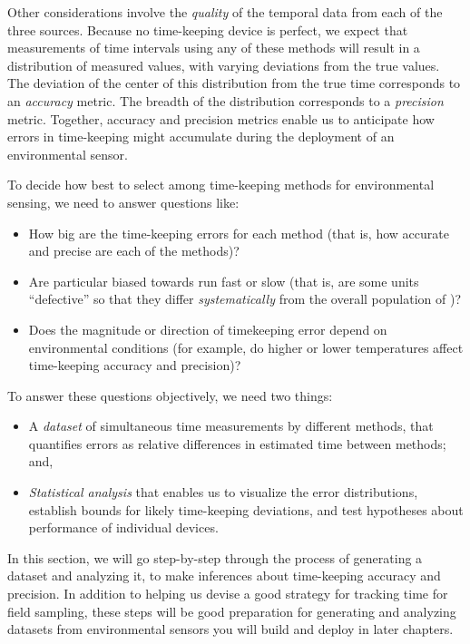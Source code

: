Other considerations involve the \emph{quality} of the temporal data from each of the three sources. %
Because no time-keeping device is perfect, we expect that measurements of time intervals using any of these methods will result in a distribution of measured values, with varying deviations from the true values. 
The deviation of the center of this distribution from the true time corresponds to an \emph{accuracy} metric. 
The breadth of the distribution corresponds to a \emph{precision} metric. 
Together, accuracy and precision metrics enable us to anticipate how errors in time-keeping might accumulate during the deployment of an environmental sensor.

To decide how best to select among time-keeping methods for environmental sensing, we need to answer questions like: 
\begin{itemize}
	\item How big are the time-keeping errors for each method (that is, how accurate and precise are each of the methods)?
	\item Are particular \rtcs biased towards run fast or slow (that is, are some units ``defective'' so that they differ \emph{systematically} from the overall population of \rtcs)?
	\item Does the magnitude or direction of timekeeping error depend on environmental conditions (for example, do higher or lower temperatures affect time-keeping accuracy and precision)?  
\end{itemize}

To answer these questions objectively, we need two things:
\begin{itemize}
	\item A \emph{dataset} of simultaneous time measurements by different methods, that quantifies errors as relative differences in estimated time between methods; and,
	\item \emph{Statistical analysis} that enables us to visualize the error distributions, establish bounds for likely time-keeping deviations, and test hypotheses about performance of individual devices.
\end{itemize}
In this section, we will go step-by-step through the process of generating a dataset and analyzing it, to make inferences about time-keeping accuracy and precision. 
In addition to helping us devise a good strategy for tracking time for field sampling, these steps will be good preparation for generating and analyzing datasets from environmental sensors you will build and deploy in later chapters.


